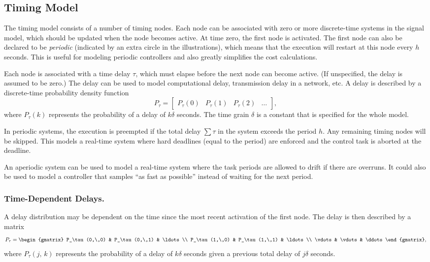 \documentclass[final,twoside]{rapport}  %
\begin{document}
\subsection{Timing Model}
The timing model consists of a number of timing nodes. Each node
can be associated with zero or more discrete-time systems in the
signal model, which should be updated when the node becomes active. At
time zero, the first node is activated. The first node can also be
declared to be {\em periodic} (indicated by an extra circle in the
illustrations), which means that the execution will restart at this
node every $h$ seconds. This is useful for modeling periodic
controllers and also greatly simplifies the cost calculations.

Each node is associated with a time delay $\tau$, which must elapse
before the next node can become active. (If unspecified, the delay is
assumed to be zero.) The delay can be used to model computational
delay, transmission delay in a network, etc. A delay is described by a
discrete-time probability density function
\begin{equation*}
P_\tau = \begin{bmatrix} P_\tau(0) & P_\tau(1) & P_\tau(2) & \ldots
\end{bmatrix},
\end{equation*}
where $P_\tau(k)$ represents the probability of a delay of
$k\delta$ seconds. The time grain $\delta$ is a constant that is
specified for the whole model.

In periodic systems, the execution is preempted if the total delay
$\sum \tau$ in the system exceeds the period $h$. Any remaining
timing nodes will be skipped. This models a real-time system where
hard deadlines (equal to the period) are enforced and the control task
is aborted at the deadline.

An aperiodic system can be used to model a real-time system where the
task periods are allowed to drift if there are overruns. It could also
be used to model a controller that samples ``as fast as
possible'' instead of waiting for the next period.

\subsubsection{Time-Dependent Delays.}

A delay distribution may be dependent on the time since the most
recent activation of the first node. The delay is then described by a
matrix
\begin{equation*}
P_\tau = \begin{gmatrix} P_\tau(0,\,0) & P_\tau(0,\,1) & \ldots \\
                         P_\tau(1,\,0) & P_\tau(1,\,1) & \ldots \\
                         \vdots & \vdots & \ddots\end{gmatrix},
\end{equation*}
where $P_\tau(j,\,k)$ represents the probability of a delay of $k\delta$
seconds given a previous total delay of $j\delta$ seconds.
\end{document}
